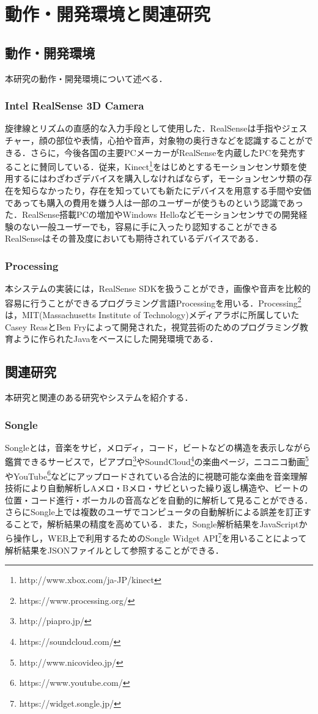 \chapter{動作・開発環境と関連研究}
\section{動作・開発環境}
本研究の動作・開発環境について述べる．

\subsection{Intel RealSense 3D Camera}
旋律線とリズムの直感的な入力手段として使用した．RealSenseは手指やジェスチャー，顔の部位や表情，心拍や音声，対象物の奥行きなどを認識することができる．さらに，今後各国の主要PCメーカーがRealSenseを内蔵したPCを発売することに賛同している．従来，Kinect\footnote{http://www.xbox.com/ja-JP/kinect}をはじめとするモーションセンサ類を使用するにはわざわざデバイスを購入しなければならず，モーションセンサ類の存在を知らなかったり，存在を知っていても新たにデバイスを用意する手間や安価であっても購入の費用を嫌う人は一部のユーザーが使うものという認識であった．RealSense搭載PCの増加やWindows Helloなどモーションセンサでの開発経験のない一般ユーザーでも，容易に手に入ったり認知することができるRealSenseはその普及度においても期待されているデバイスである．

\subsection{Processing}
本システムの実装には，RealSense SDKを扱うことができ，画像や音声を比較的容易に行うことができるプログラミング言語Processingを用いる．Processing\footnote{https://www.processing.org/}は，MIT(Massachusetts Institute of Technology)メディアラボに所属していたCasey ReasとBen Fryによって開発された，視覚芸術のためのプログラミング教育ように作られたJavaをベースにした開発環境である．\cite{takahasi2010}
\section{関連研究}
本研究と関連のある研究やシステムを紹介する．

\subsection{Songle}
Songle\cite{songle}とは，音楽をサビ，メロディ，コード，ビートなどの構造を表示しながら鑑賞できるサービスで，ピアプロ\footnote{http://piapro.jp/}やSoundCloud\footnote{https://soundcloud.com/}の楽曲ページ，ニコニコ動画\footnote{http://www.nicovideo.jp/}やYouTube\footnote{https://www.youtube.com/}などにアップロードされている合法的に視聴可能な楽曲を音楽理解技術により自動解析しAメロ・Bメロ・サビといった繰り返し構造や、ビートの位置・コード進行・ボーカルの音高などを自動的に解析して見ることができる．さらにSongle上では複数のユーザでコンピュータの自動解析による誤差を訂正することで，解析結果の精度を高めている．また，Songle解析結果をJavaScriptから操作し，WEB上で利用するためのSongle Widget API\footnote{https://widget.songle.jp/}を用いることによって解析結果をJSONファイルとして参照することができる．

